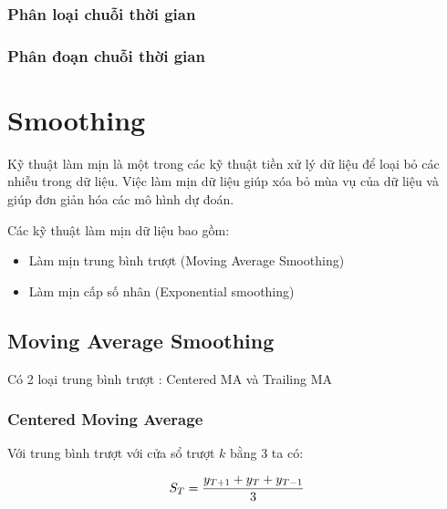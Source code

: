 \documentclass[
]{book}
\providecommand{\tightlist}{%
  \setlength{\itemsep}{0pt}\setlength{\parskip}{0pt}}
\begin{document}
\hypertarget{phuxe2n-loux1ea1i-chuux1ed7i-thux1eddi-gian}{%
\subsection{Phân loại chuỗi thời gian}\label{phuxe2n-loux1ea1i-chuux1ed7i-thux1eddi-gian}}

\hypertarget{phuxe2n-ux111oux1ea1n-chuux1ed7i-thux1eddi-gian}{%
\subsection{Phân đoạn chuỗi thời gian}\label{phuxe2n-ux111oux1ea1n-chuux1ed7i-thux1eddi-gian}}

\hypertarget{smoothing}{%
\chapter{Smoothing}\label{smoothing}}

Kỹ thuật làm mịn là một trong các kỹ thuật tiền xử lý dữ liệu để loại bỏ các nhiễu trong dữ liệu. Việc làm mịn dữ liệu giúp xóa bỏ mùa vụ của dữ liệu và giúp đơn giản hóa các mô hình dự đoán.

Các kỹ thuật làm mịn dữ liệu bao gồm:

\begin{itemize}
\tightlist
\item
  Làm mịn trung bình trượt (Moving Average Smoothing)
\item
  Làm mịn cấp số nhân (Exponential smoothing)
\end{itemize}

\hypertarget{moving-average-smoothing}{%
\section{Moving Average Smoothing}\label{moving-average-smoothing}}

Có 2 loại trung bình trượt : Centered MA và Trailing MA

\hypertarget{centered-moving-average}{%
\subsection{Centered Moving Average}\label{centered-moving-average}}

Với trung bình trượt với cửa sổ trượt \(k\) bằng 3 ta có:

\[\begin{align}
\Large S_{T} = \frac{y_{T+1} + y_{T} + y_{T-1}}{3}
\end{align}\]
\end{document}
